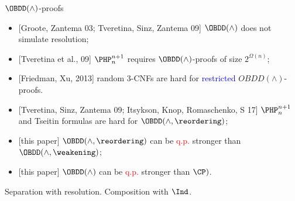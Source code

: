 \begin{frame}{$\OBDD(\land)$-proofs}
    \begin{itemize}
        \item{} [Groote, Zantema 03; Tveretina, Sinz, Zantema 09] $\OBDD(\land)$ does not simulate
            resolution;
        \item{} [Tveretina et al., 09] $\PHP^{n + 1}_n$ requires $\OBDD(\land)$-proofs of size
            $2^{\Omega(n)}$;
        \item{} [Friedman, Xu, 2013] random $3$-CNFs are hard for \textcolor{blue}{restricted}
            $OBDD(\land)$-proofs.
        \item{} [Tveretina, Sinz, Zantema 09; Itsykson, Knop, Romaschenko, S 17] $\PHP^{n + 1}_{n}$ and
            Tseitin formulas are hard for $\OBDD(\land, \reordering)$;
        \item{} [this paper] $\OBDD(\land, \reordering)$ can be \textcolor{red}{q.p.} stronger than
            $\OBDD(\land, \weakening)$; 
        \item{} [this paper] $\OBDD(\land)$ can be \textcolor{red}{q.p.} stronger than $\CP)$.
    \end{itemize}    
\end{frame}


Separation with resolution.
Composition with $\Ind$.
